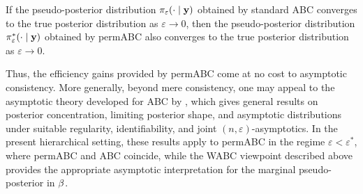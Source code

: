 \begin{corollary}
\label{col:permabc}
If the pseudo-posterior distribution \(\pi_{\varepsilon}(\cdot\mid\mathbf{y})\) obtained by standard ABC converges to the true posterior distribution as \(\varepsilon\to0\), then the pseudo-posterior distribution \(\pi^*_{\varepsilon}(\cdot\mid\mathbf{y})\) obtained by permABC also converges to the true posterior distribution as \(\varepsilon\to0\).
\end{corollary}

Thus, the efficiency gains provided by permABC come at no cost to asymptotic consistency. More generally, beyond mere consistency, one may appeal to the asymptotic theory developed for ABC by \citet{frazier2018asymptotic}, which gives general results on posterior concentration, limiting posterior shape, and asymptotic distributions under suitable regularity, identifiability, and joint \((n,\varepsilon)\)-asymptotics. In the present hierarchical setting, these results apply to permABC in the regime \(\varepsilon<\varepsilon^*\), where permABC and ABC coincide, while the WABC viewpoint described above provides the appropriate asymptotic interpretation for the marginal pseudo-posterior in \(\beta\).